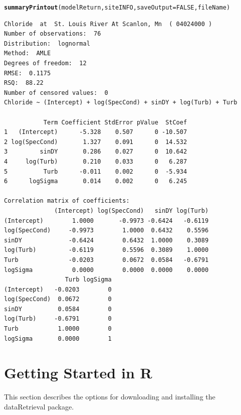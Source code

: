 \documentclass[a4paper,11pt]{article}\usepackage[]{graphicx}\usepackage[]{color}
\makeatletter
\newcommand{\hlnum}[1]{\textcolor[rgb]{0.686,0.059,0.569}{#1}}%
\newcommand{\hlstd}[1]{\textcolor[rgb]{0.345,0.345,0.345}{#1}}%
\newcommand{\hlkwc}[1]{\textcolor[rgb]{0.333,0.667,0.333}{#1}}%
\newcommand{\hlkwd}[1]{\textcolor[rgb]{0.737,0.353,0.396}{\textbf{#1}}}%
\newenvironment{kframe}{%
 \def\at@end@of@kframe{}%
 \ifinner\ifhmode%
  \def\at@end@of@kframe{\end{minipage}}%
  \begin{minipage}{\columnwidth}%
 \fi\fi%
 \def\FrameCommand##1{\hskip\@totalleftmargin \hskip-\fboxsep
 \colorbox{shadecolor}{##1}\hskip-\fboxsep
     \hskip-\linewidth \hskip-\@totalleftmargin \hskip\columnwidth}%
 \MakeFramed {\advance\hsize-\width
   \@totalleftmargin\z@ \linewidth\hsize
   \@setminipage}}%
 {\par\unskip\endMakeFramed%
 \at@end@of@kframe}
\newenvironment{knitrout}{}{} %
\makeatother
\begin{document}
\begin{knitrout}
\color{fgcolor}\begin{kframe}
\begin{alltt}
\hlkwd{summaryPrintout}\hlstd{(modelReturn, siteINFO,} \hlkwc{saveOutput}\hlstd{=}\hlnum{FALSE}\hlstd{,fileName)}
\end{alltt}
\begin{verbatim}
Chloride  at  St. Louis River At Scanlon, Mn  ( 04024000 )
Number of observations:  76 
Distribution:  lognormal 
Method:  AMLE 
Degrees of freedom:  12 
RMSE:  0.1175 
RSQ:  88.22 
Number of censored values:  0 
Chloride ~ (Intercept) + log(SpecCond) + sinDY + log(Turb) + Turb 

           Term Coefficient StdError pValue  StCoef
1   (Intercept)      -5.328    0.507      0 -10.507
2 log(SpecCond)       1.327    0.091      0  14.532
3         sinDY       0.286    0.027      0  10.642
4     log(Turb)       0.210    0.033      0   6.287
5          Turb      -0.011    0.002      0  -5.934
6      logSigma       0.014    0.002      0   6.245

Correlation matrix of coefficients: 
              (Intercept) log(SpecCond)   sinDY log(Turb)
(Intercept)        1.0000       -0.9973 -0.6424   -0.6119
log(SpecCond)     -0.9973        1.0000  0.6432    0.5596
sinDY             -0.6424        0.6432  1.0000    0.3089
log(Turb)         -0.6119        0.5596  0.3089    1.0000
Turb              -0.0203        0.0672  0.0584   -0.6791
logSigma           0.0000        0.0000  0.0000    0.0000
                 Turb logSigma
(Intercept)   -0.0203        0
log(SpecCond)  0.0672        0
sinDY          0.0584        0
log(Turb)     -0.6791        0
Turb           1.0000        0
logSigma       0.0000        1
\end{verbatim}
\end{kframe}
\end{knitrout}


\clearpage
\appendix

\section{Getting Started in R}
\label{sec:appendix1}
This section describes the options for downloading and installing the dataRetrieval package.

\end{document}
